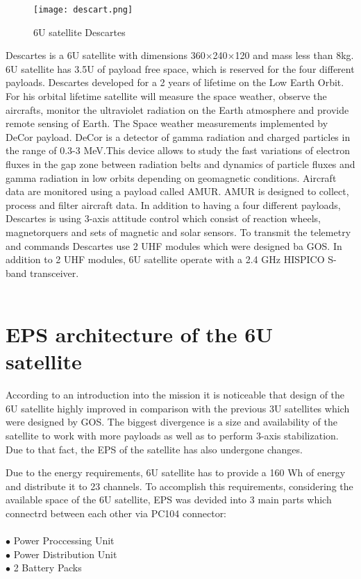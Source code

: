 \begin{figure}[h]
	\centering
	\texttt{[image: descart.png]}
	\caption{6U satellite Descartes}
	\label{fig: EPS}
\end{figure}


  Descartes is a 6U satellite with dimensions 360$\times$240$\times$120 and mass less than 8kg. 6U satellite has 3.5U of payload free space, which is reserved for the four different payloads. Descartes developed for a 2 years of lifetime on the Low Earth Orbit. For his orbital lifetime satellite will measure the space weather, observe the aircrafts, monitor the ultraviolet radiation on the Earth atmosphere  and provide remote sensing of Earth. The Space weather measurements implemented by DeCor payload. DeCor is a detector of gamma radiation and charged particles in the range of 0.3-3 MeV.This device allows to study the fast variations of electron fluxes in the gap zone between radiation belts and dynamics of particle fluxes and gamma radiation in low orbits depending on geomagnetic conditions. Aircraft data are monitored using a payload called AMUR. AMUR is designed to collect, process and filter aircraft data. 
  In addition to having a four different payloads, Descartes is using 3-axis attitude control which consist of reaction wheels, magnetorquers and sets of magnetic and solar sensors. To transmit the telemetry and commands Descartes use 2 UHF modules which were designed ba GOS. In addition to 2 UHF modules, 6U satellite operate with a 2.4 GHz HISPICO S-band transceiver.\\ \\
 
 
  \section{EPS architecture of the 6U satellite}
  According to an introduction into the mission it is noticeable that design of the 6U satellite highly improved in comparison with the previous 3U satellites which were designed by GOS. The biggest divergence is a size and availability of the satellite to work with more payloads as well as to perform 3-axis stabilization. Due to that fact, the EPS of the satellite has also undergone changes.
  
  Due to the energy requirements, 6U satellite has to provide a 160 Wh of energy and  distribute it to 23 channels. To accomplish this requirements, considering the available space of the 6U satellite, EPS was devided into 3 main parts which connectrd between each other via PC104 connector:\\ \\
  $\bullet$ Power Proccessing Unit\\
  $\bullet$ Power Distribution Unit\\
  $\bullet$ 2 Battery Packs\\
  
